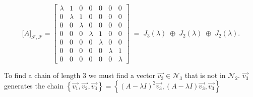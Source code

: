 \documentclass{report}
\begin{document}
{    \[
\bigl[A\bigr]_{\mathcal{F},\mathcal{F}}
=
\left[
\begin{array}{ccc|cc|cc}
\lambda & 1 & 0 & 0 & 0 & 0 & 0\\
0 & \lambda & 1 & 0 & 0 & 0 & 0\\
0 & 0 & \lambda & 0 & 0 & 0 & 0\\ \hline
0 & 0 & 0 & \lambda & 1 & 0 & 0\\
0 & 0 & 0 & 0 & \lambda & 0 & 0\\ \hline
0 & 0 & 0 & 0 & 0 & \lambda & 1\\
0 & 0 & 0 & 0 & 0 & 0 & \lambda
\end{array}
\right]
\;=\;
J_{3}(\lambda)\;\oplus\;J_{2}(\lambda)\;\oplus\;J_{2}(\lambda).
\]




  To find a chain of length $ 3$  we must find a vector $ \vec{ v_3} \in \mathcal{N} _3$  that is not in $ \mathcal{N} _2$. $ \vec{ v_3} $ generates the chain $ \left\{ \vec{ v_1} , \vec{ v_2}, \vec{ v_3}   \right\} = \left\{ \left( A- \lambda I \right) ^2 \vec{ v_3} , \left( A - \lambda I  \right) \vec{ v_3} , \vec{ v_3}  \right\} $
  }
 
\end{document}
